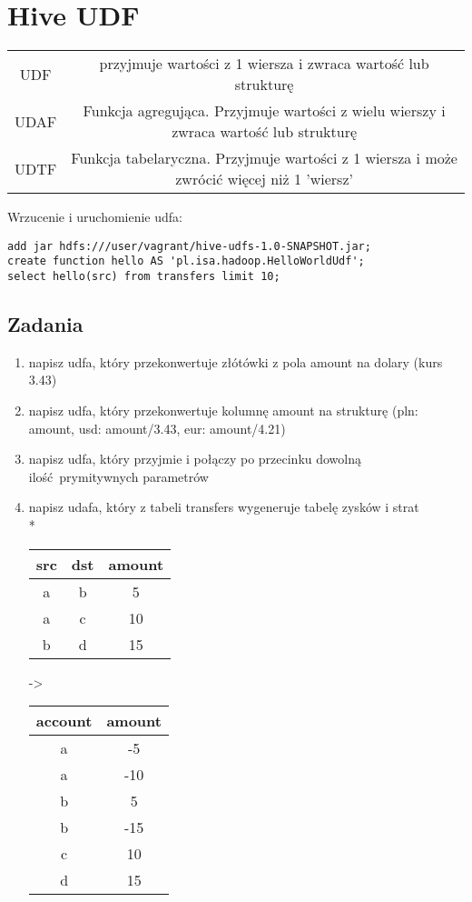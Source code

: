 \documentclass{article}
\begin{document}
\section*{Hive UDF}

\begin{tabular}{c | c }
	UDF & przyjmuje wartości z 1 wiersza i zwraca wartość lub strukturę \\
	UDAF & Funkcja agregująca. Przyjmuje wartości z wielu wierszy i zwraca wartość lub strukturę \\
	UDTF & Funkcja tabelaryczna. Przyjmuje wartości z 1 wiersza i może zwrócić więcej niż 1 'wiersz' \\
\end{tabular}

\bigskip


Wrzucenie i uruchomienie udfa:
\begin{lstlisting}
add jar hdfs:///user/vagrant/hive-udfs-1.0-SNAPSHOT.jar;
create function hello AS 'pl.isa.hadoop.HelloWorldUdf';
select hello(src) from transfers limit 10;
\end{lstlisting}

\subsection*{Zadania}

\begin{enumerate}
\item napisz udfa, który przekonwertuje złótówki z pola amount na dolary (kurs 3.43)
\item napisz udfa, który przekonwertuje kolumnę amount na strukturę (pln: amount, usd: amount/3.43, eur: amount/4.21)
\item napisz udfa, który przyjmie i połączy po przecinku dowolną ilość prymitywnych parametrów
\item napisz udafa, który z tabeli transfers wygeneruje tabelę zysków i strat
\\*
\begin{tabular}{c | c | c }
	src & dst & amount \\ \hline 
	a & b & 5 \\
	a & c & 10 \\
	b & d & 15 \\
\end{tabular}
->
\begin{tabular}{c | c}
	account & amount \\ \hline 
	a & -5 \\
	a & -10 \\
	b & 5 \\
	b & -15 \\
	c & 10 \\
	d & 15 \\
\end{tabular}
\end{enumerate}
\end{document}
